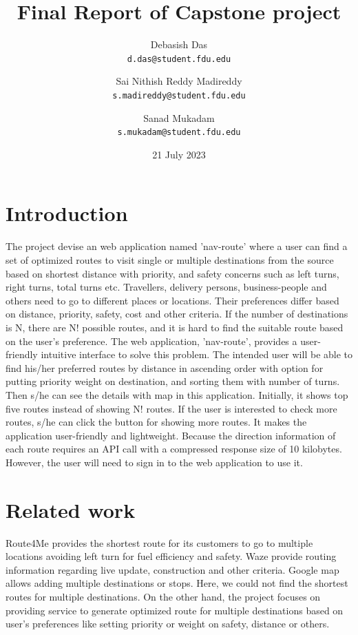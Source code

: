 \documentclass{article}
\title{Final Report of Capstone project}
\author{
  Debasish Das\\
  \texttt{d.das@student.fdu.edu}
  \and
  Sai Nithish Reddy Madireddy\\
  \texttt{s.madireddy@student.fdu.edu}
  \and
  Sanad Mukadam\\
  \texttt{s.mukadam@student.fdu.edu}
}
\date{21 July 2023}
\begin{document}
\maketitle

\section{Introduction}
The project devise an web application named 'nav-route' where a user can find a set of optimized routes to visit single or multiple destinations from the source based on shortest distance with priority, and safety concerns such as left turns, right turns, total turns etc. Travellers, delivery persons, business-people and others need to go to different places or locations. Their preferences differ based on distance, priority, safety, cost and other criteria. If the number of destinations is N, there are N! possible routes, and it is hard to find the suitable route based on the user's preference. The web application, 'nav-route', provides a user-friendly intuitive interface to solve this problem. The intended user will be able to find his/her preferred routes by distance in ascending order with option for putting priority weight on destination, and sorting them with number of turns. Then s/he can see the details with map in this application. Initially, it shows top five routes instead of showing N! routes. If the user is interested to check more routes, s/he can click the button for showing more routes. It makes the application user-friendly and lightweight. Because the direction information of each route requires an API call with a compressed response size of 10 kilobytes. However, the user will need to sign in to the web application to use it.

\section{Related work}
Route4Me provides the shortest route for its customers to go to multiple locations avoiding left turn for fuel efficiency and safety\cite{r1}. Waze provide routing information regarding live update, construction and other criteria\cite{r2}. Google map allows adding multiple destinations or stops\cite{r3}. Here, we could not find the shortest routes for multiple destinations. On the other hand, the project focuses on providing service to generate optimized route for multiple destinations based on user's preferences like setting priority or weight on safety, distance or others. 
\end{document}
